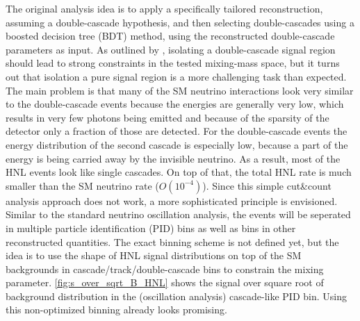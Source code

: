 \documentclass[a4paper,11pt]{article}
\begin{document}
The original analysis idea is to apply a specifically tailored reconstruction, assuming a double-cascade hypothesis, and then selecting double-cascades using a boosted decision tree (BDT) method, using the reconstructed double-cascade parameters as input. As outlined by \cite{Coloma:2017ppo}, isolating a double-cascade signal region should lead to strong constraints in the tested mixing-mass space, but it turns out that isolation a pure signal region is a more challenging task than expected. The main problem is that many of the SM neutrino interactions look very similar to the double-cascade events because the energies are generally very low, which results in very few photons being emitted and because of the sparsity of the detector only a fraction of those are detected. For the double-cascade events the energy distribution of the second cascade is especially low, because a part of the energy is being carried away by the invisible neutrino. As a result, most of the HNL events look like single cascades. On top of that, the total HNL rate is much smaller than the SM neutrino rate ($O(10^{-4})$). Since this simple cut\&count analysis approach does not work, a more sophisticated principle is envisioned. Similar to the standard neutrino oscillation analysis, the events will be seperated in multiple particle identification (PID) bins as well as bins in other reconstructed quantities. The exact binning scheme is not defined yet, but the idea is to use the shape of HNL signal distributions on top of the SM backgrounds in cascade/track/double-cascade bins to constrain the mixing parameter. \cref{fig:s_over_sqrt_B_HNL} shows the signal over square root of background distribution in the (oscillation analysis) cascade-like PID bin. Using this non-optimized binning already looks promising.

\footnotesize


\end{document}
